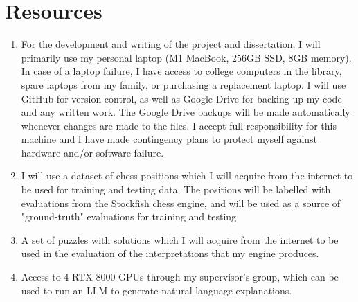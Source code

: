 \documentclass[12pt,a4paper]{article}
\begin{document}
\section*{Resources}
\begin{enumerate}
    \item For the development and writing of the project and dissertation, I will primarily use my personal laptop (M1 MacBook, 256GB SSD, 8GB memory). In case of a laptop failure, I have access to college computers in the library, spare laptops from my family, or purchasing a replacement laptop. I will use GitHub for version control, as well as Google Drive for backing up my code and any written work. The Google Drive backups will be made automatically whenever changes are made to the files. I accept full responsibility for this machine and I have made contingency plans to protect myself against hardware and/or software failure.
    \item I will use a dataset of chess positions which I will acquire from the internet to be used for training and testing data. The positions will be labelled with evaluations from the Stockfish chess engine, and will be used as a source of "ground-truth" evaluations for training and testing
    \item A set of puzzles with solutions which I will acquire from the internet to be used in the evaluation of the interpretations that my engine produces.
    \item Access to 4 RTX 8000 GPUs through my supervisor's group, which can be used to run an LLM to generate natural language explanations.
\end{enumerate}
% 
% 
\end{document}
